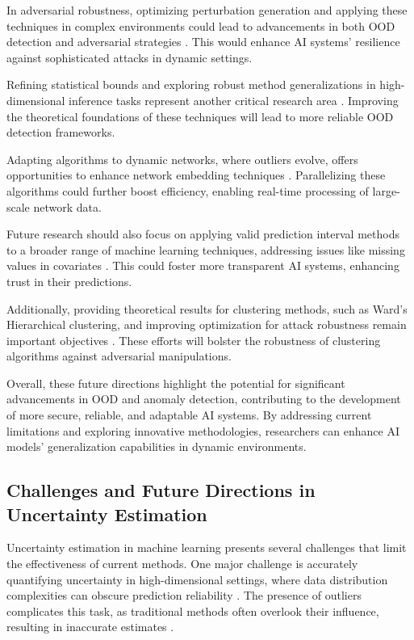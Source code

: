 In adversarial robustness, optimizing perturbation generation and applying these techniques in complex environments could lead to advancements in both OOD detection and adversarial strategies \cite{kim2020make5gcommunicationsinvisible}. This would enhance AI systems' resilience against sophisticated attacks in dynamic settings.

Refining statistical bounds and exploring robust method generalizations in high-dimensional inference tasks represent another critical research area \cite{nietert2023outlierrobustoptimaltransportduality}. Improving the theoretical foundations of these techniques will lead to more reliable OOD detection frameworks.

Adapting algorithms to dynamic networks, where outliers evolve, offers opportunities to enhance network embedding techniques \cite{bandyopadhyay2018outlierawarenetworkembedding}. Parallelizing these algorithms could further boost efficiency, enabling real-time processing of large-scale network data.

Future research should also focus on applying valid prediction interval methods to a broader range of machine learning techniques, addressing issues like missing values in covariates \cite{ramosaj2021interpretablemachinesconstructingvalid}. This could foster more transparent AI systems, enhancing trust in their predictions.

Additionally, providing theoretical results for clustering methods, such as Ward's Hierarchical clustering, and improving optimization for attack robustness remain important objectives \cite{chhabra2019suspicionfreeadversarialattacksclustering}. These efforts will bolster the robustness of clustering algorithms against adversarial manipulations.

Overall, these future directions highlight the potential for significant advancements in OOD and anomaly detection, contributing to the development of more secure, reliable, and adaptable AI systems. By addressing current limitations and exploring innovative methodologies, researchers can enhance AI models' generalization capabilities in dynamic environments.

\subsection{Challenges and Future Directions in Uncertainty Estimation} \label{subsec:Challenges and Future Directions in Uncertainty Estimation}

Uncertainty estimation in machine learning presents several challenges that limit the effectiveness of current methods. One major challenge is accurately quantifying uncertainty in high-dimensional settings, where data distribution complexities can obscure prediction reliability \cite{nietert2023outlierrobustoptimaltransportduality}. The presence of outliers complicates this task, as traditional methods often overlook their influence, resulting in inaccurate estimates \cite{nietert2023outlierrobustoptimaltransportduality}.

